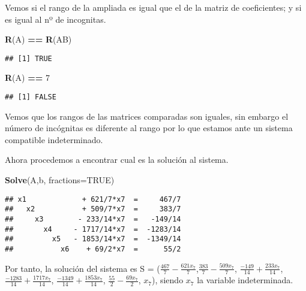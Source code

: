\documentclass[
]{article}
\newenvironment{Shaded}{\begin{snugshade}}{\end{snugshade}}
\newcommand{\DataTypeTok}[1]{\textcolor[rgb]{0.13,0.29,0.53}{#1}}
\newcommand{\DecValTok}[1]{\textcolor[rgb]{0.00,0.00,0.81}{#1}}
\newcommand{\KeywordTok}[1]{\textcolor[rgb]{0.13,0.29,0.53}{\textbf{#1}}}
\newcommand{\NormalTok}[1]{#1}
\newcommand{\OperatorTok}[1]{\textcolor[rgb]{0.81,0.36,0.00}{\textbf{#1}}}
\newcommand{\OtherTok}[1]{\textcolor[rgb]{0.56,0.35,0.01}{#1}}
\newcommand{\StringTok}[1]{\textcolor[rgb]{0.31,0.60,0.02}{#1}}
\begin{document}
Vemos si el rango de la ampliada es igual que el de la matriz de
coeficientes; y si es igual al nº de incognitas.

\begin{Shaded}
\begin{Highlighting}[]
\KeywordTok{R}\NormalTok{(A) }\OperatorTok{==}\StringTok{ }\KeywordTok{R}\NormalTok{(AB)}
\end{Highlighting}
\end{Shaded}

\begin{verbatim}
## [1] TRUE
\end{verbatim}

\begin{Shaded}
\begin{Highlighting}[]
\KeywordTok{R}\NormalTok{(A) }\OperatorTok{==}\StringTok{ }\DecValTok{7}
\end{Highlighting}
\end{Shaded}

\begin{verbatim}
## [1] FALSE
\end{verbatim}

Vemos que los rangos de las matrices comparadas son iguales, sin embargo
el número de incógnitas es diferente al rango por lo que estamos ante un
sistema compatible indeterminado.

Ahora procedemos a encontrar cual es la solución al sistema.

\begin{Shaded}
\begin{Highlighting}[]
\KeywordTok{Solve}\NormalTok{(A,b, }\DataTypeTok{fractions=}\OtherTok{TRUE}\NormalTok{)}
\end{Highlighting}
\end{Shaded}

\begin{verbatim}
## x1             + 621/7*x7  =     467/7 
##   x2           + 509/7*x7  =     383/7 
##     x3        - 233/14*x7  =   -149/14 
##       x4     - 1717/14*x7  =  -1283/14 
##         x5   - 1853/14*x7  =  -1349/14 
##           x6    + 69/2*x7  =      55/2
\end{verbatim}

Por tanto, la solución del sistema es S =
(\(\frac{467}{7} - \frac{621x_7}{7}\),\(\frac{383}{7} - \frac{509x_7}{7}\),
\(\frac{-149}{14} + \frac{233x_7}{14}\),
\(\frac{-1283}{14} + \frac{1717x_7}{14}\),
\(\frac{-1349}{14} + \frac{1853x_7}{14}\),
\(\frac{55}{2} - \frac{69x_7}{2}\), \(x_7\)), siendo \(x_7\) la variable
indeterminada.
\end{document}
